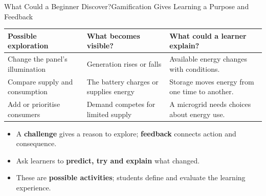\begin{frame}{What Could a Beginner Discover?}{Gamification Gives Learning a Purpose and Feedback}
\small\renewcommand{\arraystretch}{1.5}
\par\noindent\begin{tabularx}{\textwidth}{@{}>{\raggedright\arraybackslash}p{}>{\raggedright\arraybackslash}X>{\raggedright\arraybackslash}X@{}}
\toprule
\textbf{Possible exploration} & \textbf{What becomes visible?} & \textbf{What could a learner explain?}\\\midrule
Change the panel's illumination & Generation rises or falls & Available energy changes with conditions.\\
Compare supply and consumption & The battery charges or supplies energy & Storage moves energy from one time to another.\\
Add or prioritise consumers & Demand competes for limited supply & A microgrid needs choices about energy use.\\\bottomrule
\end{tabularx}\par
\vspace{.8em}
\normalsize\begin{itemize}
    \item A \textbf{challenge} gives a reason to explore; \textbf{feedback} connects action and consequence.
    \item Ask learners to \textbf{predict, try and explain} what changed.
    \item These are \textbf{possible activities}; students define and evaluate the learning experience.
\end{itemize}
\end{frame}

